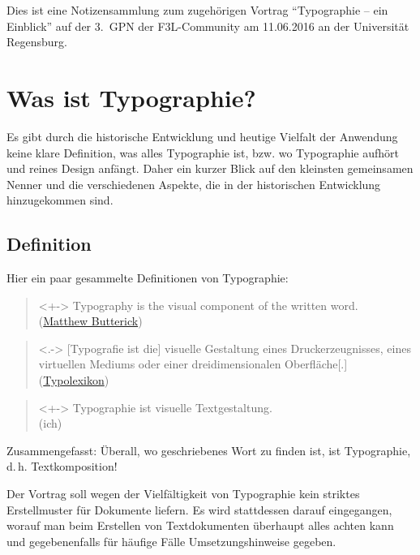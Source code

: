 
Dies ist eine Notizensammlung zum zugehörigen Vortrag
\enquote{Typographie – ein Einblick} auf der 3.~GPN der
F3L-Community am 11.06.2016 an der Universität Regensburg.

\section{Was ist Typographie?}
\frame{\sectionpage}
Es gibt durch die historische Entwicklung und heutige Vielfalt der
Anwendung keine klare Definition, was alles Typographie ist, bzw. wo
Typographie aufhört und reines Design anfängt.
Daher ein kurzer Blick auf den kleinsten gemeinsamen Nenner und die
verschiedenen Aspekte, die in der historischen Entwicklung
hinzugekommen sind.

\subsection{Definition}
Hier ein paar gesammelte Definitionen von Typographie: 
\begin{frame}
  \begin{quote}<+->
    Typography is the visual component of the written word. \\
    (\href{http://practicaltypography.com/}{Matthew Butterick})
  \end{quote}
  \begin{quote}<.->
    [Typografie ist die] visuelle Gestaltung eines Druckerzeugnisses,
    eines virtuellen Mediums oder einer dreidimensionalen Oberfläche[.]\\
    (\href{http://www.typolexikon.de/typographie/}{Typolexikon})
  \end{quote}
  \begin{quote}<+->
    Typographie ist visuelle Textgestaltung.\\
    (ich)
  \end{quote}
\end{frame}
Zusammengefasst: Überall, wo geschriebenes Wort zu finden ist, ist
Typographie, d.\,h. Textkomposition!

Der Vortrag soll wegen der Vielfältigkeit von Typographie kein striktes
Erstellmuster für Dokumente liefern. Es wird stattdessen darauf
eingegangen, worauf man beim Erstellen von Textdokumenten überhaupt alles
achten kann und gegebenenfalls für häufige Fälle Umsetzungshinweise
gegeben.


